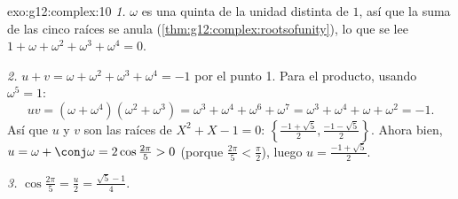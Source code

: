\begin{solution}{exo:g12:complex:10}
\emph{1.} $\omega$ es una  quinta de la unidad distinta de $1$, así que
la suma de las cinco raíces se anula
(\cref{thm:g12:complex:rootsofunity}), lo que se lee
$1 + \omega + \omega^2 + \omega^3 + \omega^4 = 0$.

\emph{2.} $u + v = \omega + \omega^2 + \omega^3 + \omega^4 = -1$ por el
punto 1. Para el producto, usando $\omega^5 = 1$:
\[
uv = (\omega + \omega^4)(\omega^2 + \omega^3)
= \omega^3 + \omega^4 + \omega^6 + \omega^7
= \omega^3 + \omega^4 + \omega + \omega^2 = -1 .
\]
Así que $u$ y $v$ son las raíces de $X^2 + X - 1 = 0$:
$\left\{\frac{-1+\sqrt5}{2}, \frac{-1-\sqrt5}{2}\right\}$. Ahora bien,
$u = \omega + \conj\omega = 2\cos\frac{2\pi}{5} > 0$ (porque
$\frac{2\pi}{5} < \frac{\pi}{2}$), luego $u = \frac{-1 + \sqrt5}{2}$.

\emph{3.} $\cos\frac{2\pi}{5} = \frac u2 = \frac{\sqrt5 - 1}{4}$.
\end{solution}


